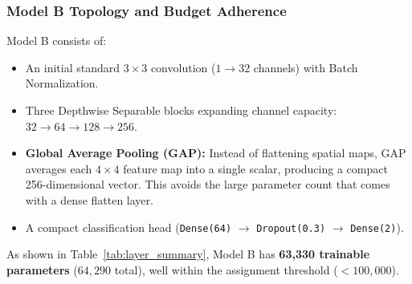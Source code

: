 \documentclass[11pt]{article}
\begin{document}
	\subsubsection{Model B Topology and Budget Adherence}
	Model B consists of:
	\begin{itemize}
		\item An initial standard $3 \times 3$ convolution ($1 \to 32$ channels) with Batch Normalization.
		\item Three Depthwise Separable blocks expanding channel capacity: $32 \to 64 \to 128 \to 256$.
		\item \textbf{Global Average Pooling (GAP):} Instead of flattening spatial maps, GAP averages each $4 \times 4$ feature map into a single scalar, producing a compact 256-dimensional vector. This avoids the large parameter count that comes with a dense flatten layer.
		\item A compact classification head (\texttt{Dense(64)} $\to$ \texttt{Dropout(0.3)} $\to$ \texttt{Dense(2)}).
	\end{itemize}
	As shown in Table~\ref{tab:layer_summary}, Model B has \textbf{63,330 trainable parameters} ($64,290$ total), well within the assignment threshold ($< 100,000$).
\end{document}
